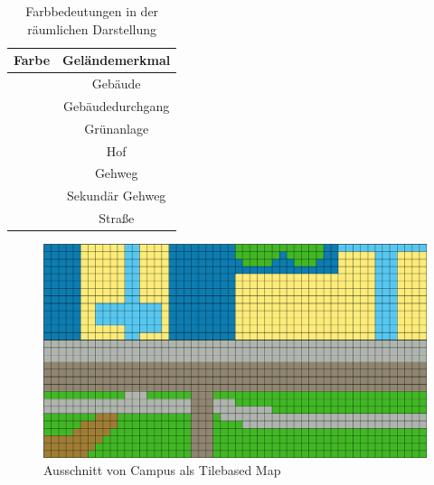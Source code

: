 \documentclass[10pt]{scrartcl}
\begin{document}
\begin{table}[h]	
	\centering
\begin{tabular}{|c|c|}
\hline 
\textbf{Farbe} & \textbf{Geländemerkmal} \\ 
\hline 
\cellcolor{gebaude} & Gebäude \\
\hline 
\cellcolor{gebaude_durchgang} & Gebäudedurchgang\\
\hline 
\cellcolor{gruenanlage} &  Grünanlage\\ 
\hline 
\cellcolor{hof} &  Hof\\ 
\hline 
\cellcolor{gehweg} & Gehweg\\ 
\hline 
\cellcolor{gehweg_sek} & Sekundär Gehweg\\
\hline 
\cellcolor{strasse} & Straße\\ 
\hline 
\end{tabular} 
	\label{tab:colorMap}
	\caption{Farbbedeutungen in der räumlichen Darstellung}	
\end{table}	



        
	\begin{figure}[H]
        
                \includegraphics[width=\textwidth]{img/tile_map_campus_pic}
        \caption{Ausschnitt von Campus als \glqq Tilebased Map\grqq{}}
        \label{img:tile_map}
	\end{figure}                
        
\end{document}
